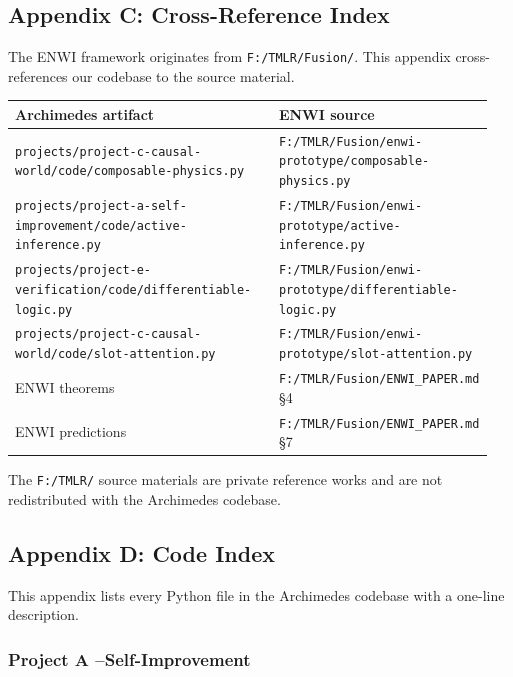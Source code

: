 \documentclass[11pt]{article}
\begin{document}
\hrulefill

\subsection{Appendix C: Cross-Reference Index}

The ENWI framework originates from \texttt{F:/TMLR/Fusion/}. This appendix cross-references
our codebase to the source material.

\begin{small}
\begin{tabular}{@{}p{0.55\linewidth}p{0.40\linewidth}@{}}
\toprule
Archimedes artifact & ENWI source \\
\midrule
\texttt{projects/project-c-causal-world/code/composable-physics.py} & \texttt{F:/TMLR/Fusion/enwi-prototype/composable-physics.py} \\
\texttt{projects/project-a-self-improvement/code/active-inference.py} & \texttt{F:/TMLR/Fusion/enwi-prototype/active-inference.py} \\
\texttt{projects/project-e-verification/code/differentiable-logic.py} & \texttt{F:/TMLR/Fusion/enwi-prototype/differentiable-logic.py} \\
\texttt{projects/project-c-causal-world/code/slot-attention.py} & \texttt{F:/TMLR/Fusion/enwi-prototype/slot-attention.py} \\
ENWI theorems & \texttt{F:/TMLR/Fusion/ENWI\_PAPER.md} \S4 \\
ENWI predictions & \texttt{F:/TMLR/Fusion/ENWI\_PAPER.md} \S7 \\
\bottomrule
\end{tabular}
\end{small}


The \texttt{F:/TMLR/} source materials are private reference works and are not
redistributed with the Archimedes codebase.

\hrulefill

\subsection{Appendix D: Code Index}

This appendix lists every Python file in the Archimedes codebase with a one-line
description.

\subsubsection{Project A --Self-Improvement}
\end{document}
